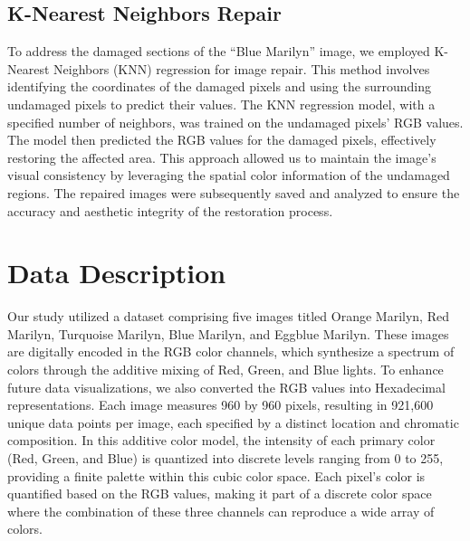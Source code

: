 \documentclass{article}
\begin{document}
\hypertarget{k-nearest-neighbors-repair}{%
\subsection{K-Nearest Neighbors
Repair}\label{k-nearest-neighbors-repair}}

To address the damaged sections of the ``Blue Marilyn'' image, we
employed K-Nearest Neighbors (KNN) regression for image repair. This
method involves identifying the coordinates of the damaged pixels and
using the surrounding undamaged pixels to predict their values. The KNN
regression model, with a specified number of neighbors, was trained on
the undamaged pixels' RGB values. The model then predicted the RGB
values for the damaged pixels, effectively restoring the affected area.
This approach allowed us to maintain the image's visual consistency by
leveraging the spatial color information of the undamaged regions. The
repaired images were subsequently saved and analyzed to ensure the
accuracy and aesthetic integrity of the restoration process.

\hypertarget{data-description}{%
\section{Data Description}\label{data-description}}

Our study utilized a dataset comprising five images titled Orange
Marilyn, Red Marilyn, Turquoise Marilyn, Blue Marilyn, and Eggblue
Marilyn. These images are digitally encoded in the RGB color channels,
which synthesize a spectrum of colors through the additive mixing of
Red, Green, and Blue lights. To enhance future data visualizations, we
also converted the RGB values into Hexadecimal representations. Each
image measures 960 by 960 pixels, resulting in 921,600 unique data
points per image, each specified by a distinct location and chromatic
composition. In this additive color model, the intensity of each primary
color (Red, Green, and Blue) is quantized into discrete levels ranging
from 0 to 255, providing a finite palette within this cubic color space.
Each pixel's color is quantified based on the RGB values, making it part
of a discrete color space where the combination of these three channels
can reproduce a wide array of colors.
\end{document}
